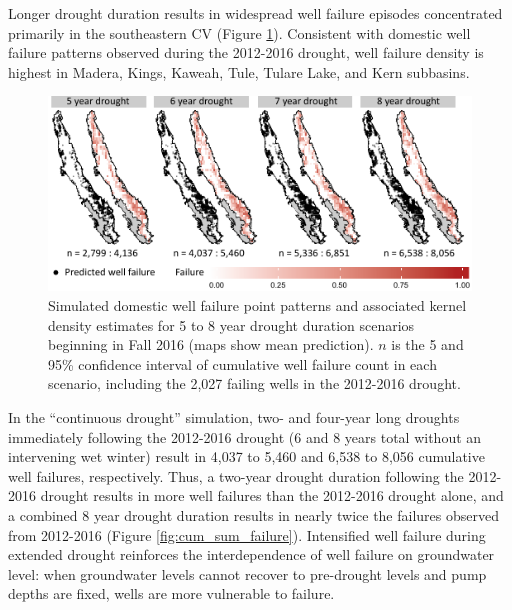 Longer drought duration results in widespread well failure episodes concentrated primarily in the southeastern CV (Figure \ref{fig:p_1_2_3_4}). Consistent with domestic well failure patterns observed during the 2012-2016 drought, well failure density is highest in Madera, Kings, Kaweah, Tule, Tulare Lake, and Kern subbasins.  

\begin{figure}%
	\includegraphics[width=\textwidth]{ch2_figs/fig_pred_1234_small_2.pdf}
	\caption{Simulated domestic well failure point patterns and associated kernel density estimates for 5 to 8 year drought duration scenarios beginning in Fall 2016 (maps show mean prediction). $n$ is the 5 and 95\% confidence interval of cumulative well failure count in each scenario, including the 2,027 failing wells in the 2012-2016 drought.}
	\label{fig:p_1_2_3_4}
\end{figure}

In the ``continuous drought'' simulation, two- and four-year long droughts immediately following the 2012-2016 drought (6 and 8 years total without an intervening wet winter) result in 4,037 to 5,460 and 6,538 to 8,056 cumulative well failures, respectively. Thus, a two-year drought duration following the 2012-2016 drought results in more well failures than the 2012-2016 drought alone, and a combined 8 year drought duration results in nearly twice the failures observed from 2012-2016 (Figure \ref{fig:cum_sum_failure}). Intensified well failure during extended drought reinforces the interdependence of well failure on groundwater level: when groundwater levels cannot recover to pre-drought levels and pump depths are fixed, wells are more vulnerable to failure.  

